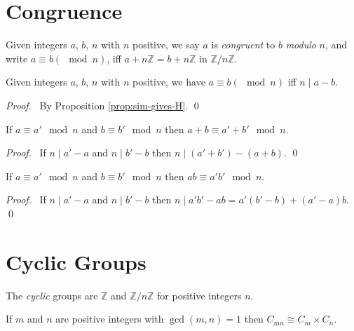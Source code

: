 \section{Congruence}

\begin{df}[Congruence]
Given integers $a$, $b$, $n$ with $n$ positive, we say $a$ is \emph{congruent} to $b$ \emph{modulo} $n$, and write $a \equiv b (\mod n)$, iff $a + n \mathbb{Z} = b + n \mathbb{Z}$ in $\mathbb{Z} / n \mathbb{Z}$.
\end{df}

\begin{prop}
Given integers $a$, $b$, $n$ with $n$ positive, we have $a \equiv b (\mod n)$ iff $n \mid a - b$.
\end{prop}

\begin{proof}
\pf\ By Proposition \ref{prop:sim-gives-H}. \qed
\end{proof}

\begin{prop}
    If $a \equiv a' \mod n$ and $b \equiv b' \mod n$ then $a + b \equiv a' + b' \mod n$.
\end{prop}

\begin{proof}
    \pf\ If $n \mid a' - a$ and $n \mid b' - b$ then $n \mid (a' + b') - (a + b)$. \qed
\end{proof}

\begin{prop}
    If $a \equiv a' \mod n$ and $b \equiv b' \mod n$ then $ab \equiv a'b' \mod n$.
\end{prop}

\begin{proof}
    \pf\ If $n \mid a' - a$ and $n \mid b' - b$ then $n \mid a'b' - ab = a'(b'-b) + (a'-a)b$. \qed
\end{proof}

\section{Cyclic Groups}

\begin{df}
    The \emph{cyclic} groups are $\mathbb{Z}$ and $\mathbb{Z} / n \mathbb{Z}$ for positive integers $n$.
\end{df}

\begin{prop}
    If $m$ and $n$ are positive integers with $\gcd(m,n) = 1$ then $C_{mn} \cong C_m \times C_n$.
\end{prop}

